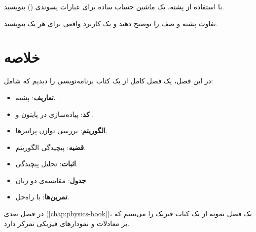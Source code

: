 \begin{exercise}
    با استفاده از پشته، یک ماشین حساب ساده
    برای عبارات پسوندی () بنویسید.
    \label{exc:postfix-calculator}
\end{exercise}

\begin{exercise}
    تفاوت پشته و صف را توضیح دهید و یک
    کاربرد واقعی برای هر یک بنویسید.
    \label{exc:stack-vs-queue}
\end{exercise}

\section{خلاصه}
\label{sec:programming-book-summary}

در این فصل، یک فصل کامل از یک کتاب
برنامه‌نویسی را دیدیم که شامل:

\begin{itemize}
    \item \textbf{تعاریف}: پشته، .
    \item \textbf{کد}: پیاده‌سازی در پایتون
    و .
    \item \textbf{الگوریتم}: بررسی توازن
    پرانتزها.
    \item \textbf{قضیه}: پیچیدگی الگوریتم.
    \item \textbf{اثبات}: تحلیل پیچیدگی.
    \item \textbf{جدول}: مقایسه‌ی دو زبان.
    \item \textbf{تمرین‌ها}: با راه‌حل.
\end{itemize}


در فصل بعدی (\cref{chap:physics-book})،
یک فصل نمونه از یک کتاب فیزیک را می‌بینیم
که بر معادلات و نمودارهای فیزیکی تمرکز
دارد.